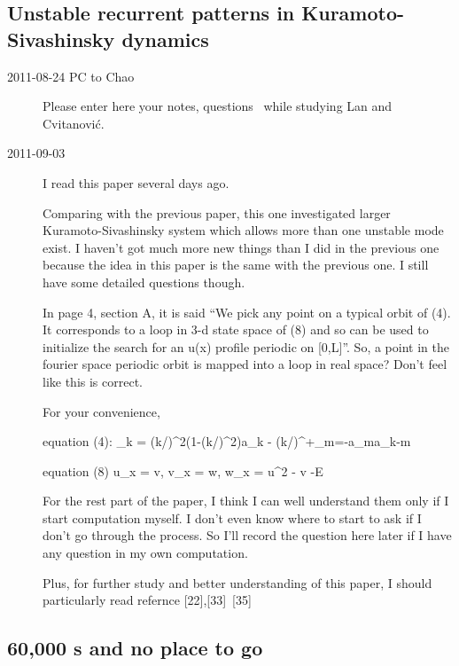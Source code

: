\subsection{Unstable recurrent patterns in {Kuramoto-Sivashinsky} dynamics}
\label{s:lanCvit07}

\begin{description}

\item[2011-08-24 PC to Chao]
Please enter here your notes, questions \etc\ while studying
Lan and Cvitanovi{\'c}.
\item[2011-09-03]
I read this paper several days ago.

Comparing with the previous paper, this one investigated larger Kuramoto-Sivashinsky system which allows more than one unstable mode exist. I haven't got much more new things than I did in the previous one because the idea in this paper is the same with the previous one. I still have some detailed questions though. 

In page 4, section A, it is said ``We pick any point on a typical orbit of (4). It corresponds to a loop in 3-d state space of (8) and so can be used to initialize the search for an u(x) profile periodic on [0,L]''. So, a point in the fourier space periodic orbit is mapped into a loop in real space? Don't feel like this is correct.

For your convenience, 

equation (4): 
\beq\displaystyle{}_{k} = (k/)^{2}(1-(k/)^{2})a_{k} - (k/)\sum\nolimits^{+\infty}_{m=-\infty}a_{m}a_{k-m}\eeq

equation (8)  
\beq u_x = v, v_x = w, w_x = u^2 - v -E\eeq

For the rest part of the paper, I think I can well understand them only if I start computation myself. I don't even know where to start to ask if I don't go through the process. So I'll record the question here later if I have any question in my own computation. 

Plus, for further study and better understanding of this paper, I should particularly read refernce [22],[33]~[35]
 
\end{description}



\subsection{60,000 \rpo s and no place to go}
\label{s:SCD07}

